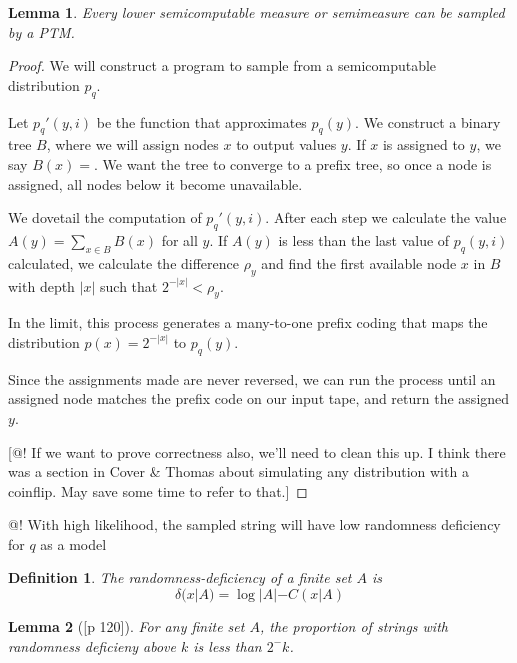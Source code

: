\documentclass[10pt,a4paper,oneside]{article}
\newtheorem{lma}{Lemma}
\newtheorem{dfn}{Definition}
\begin{document}
\begin{lma}
Every lower semicomputable measure or semimeasure can be sampled by a PTM.
\end{lma}
\begin{proof}
We will construct a program to sample from a semicomputable distribution $p_q$. 

Let $p_q'(y, i)$ be the function that approximates $p_q(y)$. We construct a binary tree $B$, where we will assign nodes $x$ to output values $y$. If $x$ is assigned to $y$, we say $B(x) = $. We want the tree to converge to a prefix tree, so once a node is assigned, all nodes below it become unavailable. 

We dovetail the computation of $p_q'(y, i)$. After each step we calculate the value $A(y) = \sum_{x \in B} B(x)$ for all $y$. If $A(y)$ is less than the last value of $p_q(y, i)$ calculated, we calculate the difference $\rho_y$ and find the first available  node $x$ in $B$ with depth $|x|$ such that $2^{-|x|} < \rho_y$.

In the limit, this process generates a many-to-one prefix coding that maps the distribution $p(x) = 2^{-|x|}$ to $p_q(y)$.

Since the assignments made are never reversed, we can run the process until an assigned node matches the prefix code on our input tape, and return the assigned $y$.
  
[@! If we want to prove correctness also, we'll need to clean this up. I think there was a section in Cover \& Thomas about simulating any distribution with a coinflip. May save some time to refer to that.]
\end{proof}

@! With high likelihood, the sampled string will have low randomness deficiency for $q$ as a model

\begin{dfn}
The randomness-deficiency of a finite set $A$ is 
\[
\delta(x|A) = \log |A| - C(x|A)
\]
\end{dfn}

\begin{lma}[{\cite{li1993introduction}[p 120]}]
For any finite set $A$, the proportion of strings with randomness deficieny above $k$ is less than $2^-k$. 

\label{lma:rd-finitesets}
\end{lma}
\end{document}
